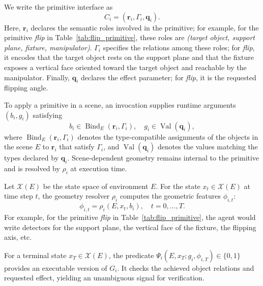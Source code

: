 We write the primitive interface as
\begin{equation*}
    C_i=(\mathbf{r}_i,\Gamma_i,\mathbf{q}_i).
\end{equation*}
Here, $\mathbf{r}_i$ declares the semantic roles involved in the primitive; for example, for the primitive \textit{flip} in Table~\ref{tab:flip_primitive}, these roles are \textit{(target object, support plane, fixture, manipulator)}. $\Gamma_i$ specifies the relations among these roles; for \textit{flip}, it encodes that the target object rests on the support plane and that the fixture exposes a vertical face oriented toward the target object and reachable by the manipulator. Finally, $\mathbf{q}_i$ declares the effect parameter; for \textit{flip}, it is the requested flipping angle.

To apply a primitive in a scene, an invocation supplies runtime arguments $(b_i,g_i)$ satisfying
\begin{equation*}
    b_i\in\operatorname{Bind}_E(\mathbf{r}_i,\Gamma_i),
    \quad
    g_i\in\operatorname{Val}(\mathbf{q}_i),
\end{equation*}
where $\operatorname{Bind}_E(\mathbf{r}_i,\Gamma_i)$ denotes the type-compatible assignments of the objects in the scene $E$ to $\mathbf{r}_i$ that satisfy $\Gamma_i$, and $\operatorname{Val}(\mathbf{q}_i)$ denotes the values matching the types declared by $\mathbf{q}_i$. Scene-dependent geometry remains internal to the primitive and is resolved by $\rho_i$ at execution time.

Let $\mathcal{X}(E)$ be the state space of environment $E$. For the state $x_t\in\mathcal{X}(E)$ at time step $t$, the geometry resolver $\rho_i$ computes the geometric features $\phi_{i,t}$: 
\begin{equation*}
    \phi_{i,t} = \rho_i(E,x_t,b_i), \quad t=0,\ldots,T.
\end{equation*}
For example, for the primitive \textit{flip} in Table~\ref{tab:flip_primitive}, the agent would write detectors for the support plane, the vertical face of the fixture, the flipping axis, etc. 

For a terminal state $x_T\in\mathcal{X}(E)$, the predicate $\Psi_i(E,x_T;g_i,\phi_{i,T})\in\{0,1\}$ provides an executable version of $G_i$. It checks the achieved object relations and requested effect, yielding an unambiguous signal for verification. 

